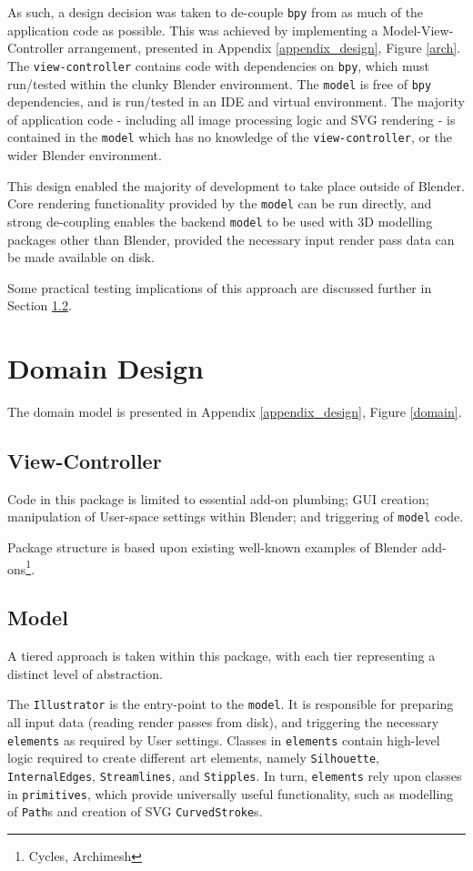 {As such, a design decision was taken to de-couple \texttt{bpy} from as much of the application code as possible.
This was achieved by implementing a Model-View-Controller arrangement, presented in Appendix \ref{appendix_design}, Figure \ref{arch}.
The \texttt{view-controller} contains code with dependencies on \texttt{bpy}, which must run/tested within the clunky Blender environment. 
The \texttt{model} is free of \texttt{bpy} dependencies, and is run/tested in an IDE and virtual environment. 
The majority of application code - including all image processing logic and SVG rendering - is contained in the \texttt{model} which has no knowledge of the \texttt{view-controller}, or the wider Blender environment.

This design enabled the majority of development to take place outside of Blender.
Core rendering functionality provided by the \texttt{model} can be run directly, and strong de-coupling enables the backend \texttt{model} to be used with 3D modelling packages other than Blender, provided the necessary input render pass data can be made available on disk.

Some practical testing implications of this approach are discussed further in Section \ref{}.

\section{Domain Design}

The domain model is presented in Appendix \ref{appendix_design}, Figure \ref{domain}.

\subsection{View-Controller}

Code in this package is limited to essential add-on plumbing; GUI creation; manipulation of User-space settings within Blender; and triggering of \texttt{model} code.

Package structure is based upon existing well-known examples of Blender add-ons\footnote{Cycles, Archimesh}.

\subsection{Model}

A tiered approach is taken within this package, with each tier representing a distinct level of abstraction.

The \texttt{Illustrator} is the entry-point to the \texttt{model}. 
It is responsible for preparing all input data (reading render passes from disk), and triggering the necessary \texttt{elements} as required by User settings.
Classes in \texttt{elements} contain high-level logic required to create different art elements, namely \texttt{Silhouette}, \texttt{InternalEdges}, \texttt{Streamlines}, and \texttt{Stipples}.
In turn, \texttt{elements} rely upon classes in \texttt{primitives}, which provide universally useful functionality, such as modelling of \texttt{Path}s and creation of SVG \texttt{CurvedStroke}s.

}
